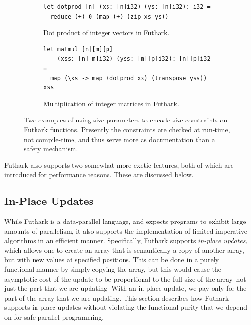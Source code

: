 \begin{figure}
  \centering
  \begin{subfigure}{1\textwidth}
    \begin{lstlisting}
let dotprod [n] (xs: [n]i32) (ys: [n]i32): i32 =
  reduce (+) 0 (map (+) (zip xs ys))
\end{lstlisting}
    \caption{Dot product of integer vectors in Futhark.}
    \label{fig:futhark-dotprod}
  \end{subfigure}
\par\bigskip
  \begin{subfigure}{1\textwidth}
\begin{lstlisting}
let matmul [n][m][p]
    (xss: [n][m]i32) (yss: [m][p]i32): [n][p]i32 =
  map (\xs -> map (dotprod xs) (transpose yss)) xss
\end{lstlisting}
    \caption{Multiplication of integer matrices in Futhark.}
    \label{fig:futhark-matmult}
  \end{subfigure}

  \caption{Two examples of using size parameters to encode size constraints on Futhark functions.  Presently the constraints are checked at run-time, not compile-time, and thus serve more as documentation than a safety mechanism.}
  \label{fig:futhark-size-parameters}
\end{figure}

Futhark also supports two somewhat more exotic features, both of which
are introduced for performance reasons.  These are discussed below.

\subsection{In-Place Updates}
\label{sec:uniqueness-types}

While Futhark is a data-parallel language, and expects programs to
exhibit large amounts of parallelism, it also supports the
implementation of limited imperative algorithms in an efficient
manner.  Specifically, Futhark supports \textit{in-place updates},
which allows one to create an array that is semantically a copy of
another array, but with new values at specified positions.  This can
be done in a purely functional manner by simply copying the array, but
this would cause the asymptotic cost of the update to be proportional
to the full size of the array, not just the part that we are updating.
With an in-place update, we pay only for the part of the array that we
are updating.  This section describes how Futhark supports in-place
updates without violating the functional purity that we depend on for
safe parallel programming.

